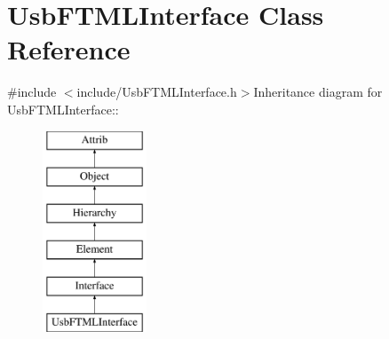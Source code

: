 \hypertarget{classUsbFTMLInterface}{
\section{UsbFTMLInterface Class Reference}
\label{classUsbFTMLInterface}
}


{\ttfamily \#include $<$include/UsbFTMLInterface.h$>$}Inheritance diagram for UsbFTMLInterface::\begin{figure}[H]
\begin{center}
\leavevmode
\includegraphics[height=6cm]{classUsbFTMLInterface}
\end{center}
\end{figure}
